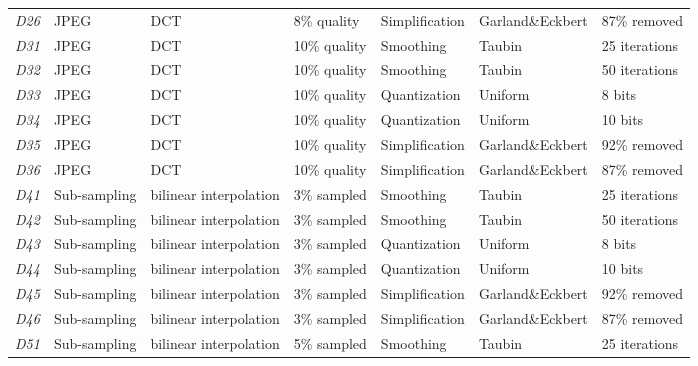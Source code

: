\begin{table}[]
\begin{tabular}{lllllll}
\textit{D26} & JPEG         & DCT                          & 8\% quality  & Simplification & Garland\&Eckbert  \cite{Garland_1997}            & 87\% removed   \\
\textit{D31} & JPEG         & DCT                          & 10\% quality & Smoothing      & Taubin                        & 25  iterations \\
\textit{D32} & JPEG         & DCT                          & 10\% quality & Smoothing      & Taubin                        & 50 iterations  \\
\textit{D33} & JPEG         & DCT                          & 10\% quality & Quantization   & Uniform                       & 8 bits         \\
\textit{D34} & JPEG         & DCT                          & 10\% quality & Quantization   & Uniform                       & 10 bits        \\
\textit{D35} & JPEG         & DCT                          & 10\% quality & Simplification & Garland\&Eckbert  \cite{Garland_1997}            & 92\% removed   \\
\textit{D36} & JPEG         & DCT                          & 10\% quality & Simplification & Garland\&Eckbert   \cite{Garland_1997}           & 87\% removed   \\
\textit{D41} & Sub-sampling & bilinear interpolation       & 3\% sampled  & Smoothing      & Taubin                        & 25  iterations \\
\textit{D42} & Sub-sampling & bilinear interpolation       & 3\% sampled  & Smoothing      & Taubin                        & 50 iterations  \\
\textit{D43} & Sub-sampling & bilinear interpolation       & 3\% sampled  & Quantization   & Uniform                       & 8 bits         \\
\textit{D44} & Sub-sampling & bilinear interpolation       & 3\% sampled  & Quantization   & Uniform                       & 10 bits        \\
\textit{D45} & Sub-sampling & bilinear interpolation       & 3\% sampled  & Simplification & Garland\&Eckbert \cite{Garland_1997}             & 92\% removed   \\
\textit{D46} & Sub-sampling & bilinear interpolation       & 3\% sampled  & Simplification & Garland\&Eckbert  \cite{Garland_1997}            & 87\% removed   \\
\textit{D51} & Sub-sampling & bilinear interpolation       & 5\% sampled  & Smoothing      & Taubin                        & 25  iterations \\

\end{tabular}
\end{table}
